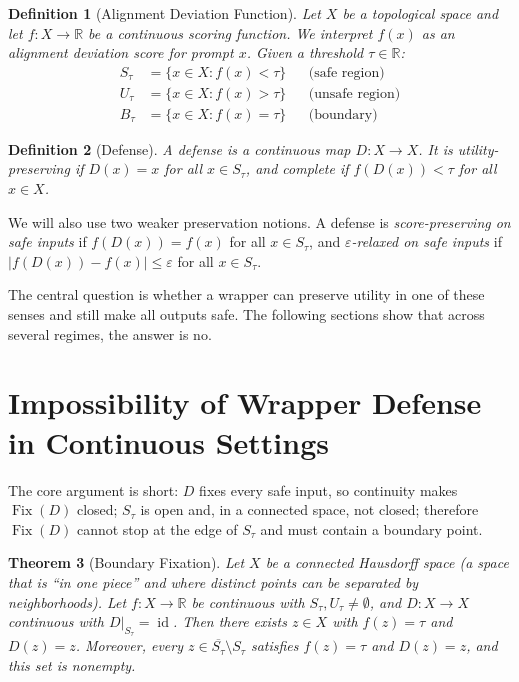 \documentclass[11pt]{article}
\newtheorem{theorem}{Theorem}[section]
\newtheorem{definition}[theorem]{Definition}
\newcommand{\R}{\mathbb{R}}
\newcommand{\cl}[1]{\overline{#1}}
\newcommand{\Fix}{\operatorname{Fix}}
\newcommand{\id}{\operatorname{id}}
\begin{document}
\begin{definition}[Alignment Deviation Function]
\label{def:ad}
Let $X$ be a topological space and let $f\colon X \to \R$ be a
continuous scoring function. We interpret $f(x)$ as an alignment
deviation score for prompt $x$. Given a threshold $\tau\in\R$:
\begin{align}
  S_\tau &= \{x \in X : f(x) < \tau\}  &&\text{(safe region)} \\
  U_\tau &= \{x \in X : f(x) > \tau\}  &&\text{(unsafe region)} \\
  B_\tau &= \{x \in X : f(x) = \tau\}  &&\text{(boundary)}
\end{align}
\end{definition}

\begin{definition}[Defense]
\label{def:defense}
A \emph{defense} is a continuous map $D\colon X \to X$. It is
\emph{utility-preserving} if $D(x) = x$ for all $x \in S_\tau$, and
\emph{complete} if $f(D(x)) < \tau$ for all $x\in X$.
\end{definition}

We will also use two weaker preservation notions. A defense is
\emph{score-preserving on safe inputs} if $f(D(x)) = f(x)$ for all
$x \in S_\tau$, and \emph{$\varepsilon$-relaxed on safe inputs} if
$|f(D(x)) - f(x)| \leq \varepsilon$ for all $x \in S_\tau$.

The central question is whether a wrapper can preserve utility in one
of these senses and still make all outputs safe. The following sections
show that across several regimes, the answer is no.


\section{Impossibility of Wrapper Defense in Continuous Settings}
\label{sec:boundary}

The core argument is short: $D$ fixes every safe input, so continuity
makes $\Fix(D)$ closed; $S_\tau$ is open and, in a connected space, not
closed; therefore $\Fix(D)$ cannot stop at the edge of $S_\tau$ and must
contain a boundary point.

\begin{theorem}[Boundary Fixation]
\label{thm:main}
Let $X$ be a connected Hausdorff space (a space that is ``in one
piece'' and where distinct points can be separated by neighborhoods).
Let $f\colon X\to\R$ be continuous with $S_\tau, U_\tau \neq
\emptyset$, and $D\colon X \to X$ continuous with
$D|_{S_\tau} = \id$. Then there exists $z\in X$ with $f(z) = \tau$
and $D(z) = z$. Moreover, every $z \in \cl{S_\tau} \setminus S_\tau$
satisfies $f(z) = \tau$ and $D(z) = z$, and this set is nonempty.
\end{theorem}
\end{document}
